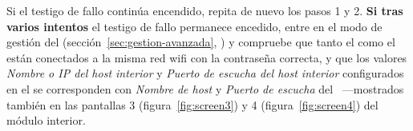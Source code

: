 \begin{enumeratecompact}
\begin{itemizecompact}
\item Si el testigo de fallo  continúa encendido, repita de nuevo los pasos 1 y 2. \textbf{\color{main}Si tras varios intentos} el testigo de fallo  permanece encedido, entre en el modo de gestión del \ME (sección~\ref{sec:gestion-avanzada}, \textit{}) y compruebe que tanto el \MI como el \ME están conectados a la misma red wifi con la contraseña correcta, y que los valores \emph{Nombre o IP del host interior} y \emph{Puerto de escucha del host interior} configurados en el \ME se corresponden con \emph{Nombre de host} y \emph{Puerto de escucha} del \MI~---mostrados también en las pantallas 3 (figura~\ref{fig:screen3}) y 4 (figura~\ref{fig:screen4}) del módulo interior.

\end{itemizecompact}

\end{enumeratecompact}

